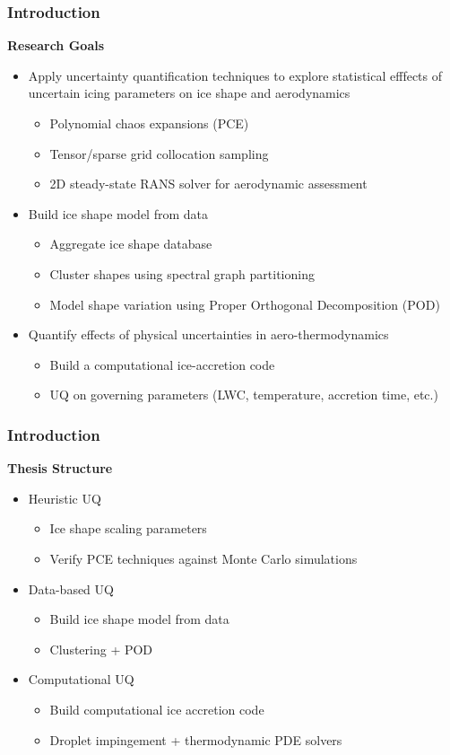 \documentclass[9pt]{beamer}
\begin{document}
\begin{frame}
\frametitle{Introduction}
\label{sec-1-9}

\textbf{Research Goals}
\begin{itemize}
\item Apply uncertainty quantification techniques to explore statistical
  efffects of uncertain icing parameters on ice shape and aerodynamics
\begin{itemize}
\item Polynomial chaos expansions (PCE)
\item Tensor/sparse grid collocation sampling
\item 2D steady-state RANS solver for aerodynamic assessment
\end{itemize}
\item Build ice shape model from data
\begin{itemize}
\item Aggregate ice shape database
\item Cluster shapes using spectral graph partitioning
\item Model shape variation using Proper Orthogonal Decomposition (POD)
\end{itemize}
\item Quantify effects of physical uncertainties in aero-thermodynamics
\begin{itemize}
\item Build a computational ice-accretion code
\item UQ on governing parameters (LWC, temperature, accretion time, etc.)
\end{itemize}
\end{itemize}
\end{frame}
\begin{frame}
\frametitle{Introduction}
\label{sec-1-10}

\textbf{Thesis Structure}
\begin{itemize}
\item Heuristic UQ
\begin{itemize}
\item Ice shape scaling parameters
\item Verify PCE techniques against Monte Carlo simulations
\end{itemize}
\item Data-based UQ
\begin{itemize}
\item Build ice shape model from data
\item Clustering + POD
\end{itemize}
\item Computational UQ
\begin{itemize}
\item Build computational ice accretion code
\item Droplet impingement + thermodynamic PDE solvers
\end{itemize}
\end{itemize}
\end{frame}
\end{document}
